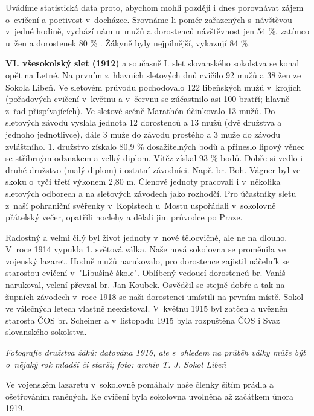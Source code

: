 \documentclass[a5paper, 12pt, twoside]{article}
\begin{document}
Uvádíme statistická data proto, abychom mohli později i dnes porovnávat
zájem o~cvičení a poctivost v~docházce. Srovnáme-li poměr zařazených
s~návštěvou v~jedné hodině, vychází nám u~mužů a dorostenců návštěvnost
jen 54 \%, zatímco u~žen a dorostenek 80 \% . Žákyně byly nejpilnější,
vykazují 84 \%.

\textbf{VI. všesokolský slet (1912)} a současně I. slet slovanského
sokolstva se konal opět na Letné. Na prvním z~hlavních sletových dnů
cvičilo 92 mužů a 38 žen ze Sokola Libeň. Ve sletovém průvodu
pochodovalo 122 libeňských mužů v~krojích (pořadových cvičení v~květnu a
v~červnu se zúčastnilo asi 100 bratří; hlavně z~řad přispívajících). Ve
sletové scéně Marathón účinkovalo 13 mužů. Do sletových závodů vyslala
jednota 12 dorostenců a 13 mužů (dvě družstva a jednoho jednotlivce),
dále 3 muže do závodu prostého a 3 muže do závodu zvláštního. 1.
družstvo získalo 80,9 \% dosažitelných bodů a přineslo lipový věnec se
stříbrným odznakem a velký diplom. Vítěz získal 93 \% bodů. Dobře si
vedlo i druhé družstvo (malý diplom) i ostatní závodníci. Např. br. Boh.
Vágner byl ve skoku o~tyči třetí výkonem 2,80 m. Členové jednoty
pracovali i v~několika sletových odborech a na sletových závodech jako
rozhodčí. Pro účastníky sletu z~naší pohraniční svěřenky v~Kopistech
u~Mostu uspořádali v~sokolovně přátelský večer, opatřili noclehy a dělali
jim průvodce po Praze.

Radostný a velmi čilý byl život jednoty v~nové tělocvičně, ale ne na
dlouho. V~roce 1914 vypukla 1. světová válka. Naše nová sokolovna se
proměnila ve vojenský lazaret. Hodně mužů narukovalo, pro dorostence
zajistil náčelník se starostou cvičení v~"Libušině škole". Oblíbený
vedoucí dorostenců br. Vaniš narukoval, velení převzal br. Jan Koubek.
Osvědčil se stejně dobře a tak na župních závodech v~roce 1918 se naši
dorostenci umístili na prvním místě. Sokol ve válečných letech vlastně
neexistoval. V~květnu 1915 byl zatčen a uvězněn starosta ČOS br.
Scheiner a v~listopadu 1915 byla rozpuštěna ČOS i Svaz slovanského
sokolstva.


\textit{Fotografie družstva žáků; datována 1916, ale s~ohledem na průběh
války může být o~nějaký rok mladší či starší;} \textit{foto: archiv T. J.
Sokol Libeň}

Ve vojenském lazaretu v~sokolovně pomáhaly naše členky šitím prádla a
ošetřováním raněných. Ke cvičení byla sokolovna uvolněna až začátkem
února 1919.
\end{document}
